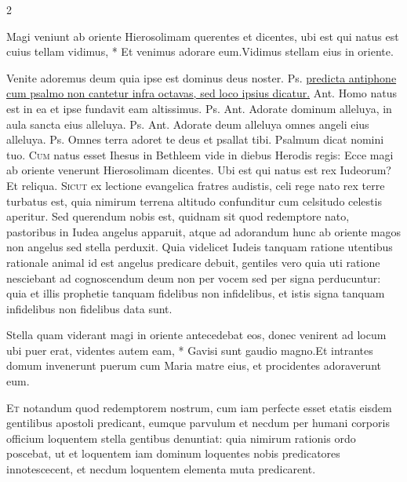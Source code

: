 \begin{multicols*}{2}
\begin{responsory-doxology}
{Magi veniunt ab oriente Hierosolimam querentes et dicentes, ubi est qui natus est cuius tellam vidimus, * Et venimus adorare eum.}{Vidimus stellam eius in oriente.}
\end{responsory-doxology}%
 Venite adoremus deum quia ipse est dominus deus noster. {\color{Red} Ps.}  \ul{predicta antiphone cum psalmo non cantetur infra octavas, sed loco ipsius dicatur.} {\color{Red} Ant.} Homo natus est in ea et ipse fundavit eam altissimus. {\color{Red} Ps.}  {\color{Red} Ant.} Adorate dominum alleluya, in aula sancta eius alleluya. {\color{Red} Ps.}  {\color{Red} Ant.} Adorate deum alleluya omnes angeli eius alleluya. {\color{Red} Ps.}  \V Omnes terra adoret te deus et psallat tibi. \R Psalmum dicat nomini tuo.
\lettrine[lines=2]{\zallmancaps \color{Blue} C}{um} natus esset Ihesus in Bethleem vide in diebus Herodis regis: Ecce magi ab oriente venerunt Hierosolimam dicentes. Ubi est qui natus est rex Iudeorum? Et reliqua.
\lettrine[lines=2]{\zallmancaps \color{Red} S}{icut} ex lectione evangelica fratres audistis, celi rege nato rex terre turbatus est, quia nimirum terrena altitudo confunditur cum celsitudo celestis aperitur. Sed querendum nobis est, quidnam sit quod redemptore nato, pastoribus in Iudea angelus apparuit, atque ad adorandum hunc ab oriente magos non angelus sed stella perduxit. Quia videlicet Iudeis tanquam ratione utentibus rationale animal id est angelus predicare debuit, gentiles vero quia uti ratione nesciebant ad cognoscendum deum non per vocem sed per signa perducuntur: quia et illis prophetie tanquam fidelibus non infidelibus, et istis signa tanquam infidelibus non fidelibus data sunt.
\begin{responsory}
{Stella quam viderant magi in oriente antecedebat eos, donec venirent ad locum ubi puer erat, videntes autem eam, * Gavisi sunt gaudio magno.}{Et intrantes domum invenerunt puerum cum Maria matre eius, et procidentes adoraverunt eum.}
\end{responsory}%
\lettrine[lines=2]{\zallmancaps \color{Blue} E}{t} notandum quod redemptorem nostrum, cum iam perfecte esset etatis eisdem gentilibus apostoli predicant, eumque parvulum et necdum per humani corporis officium loquentem stella gentibus denuntiat: quia nimirum rationis ordo poscebat, ut et loquentem iam dominum loquentes nobis predicatores innotescecent, et necdum loquentem elementa muta predicarent.

\end{multicols*}
